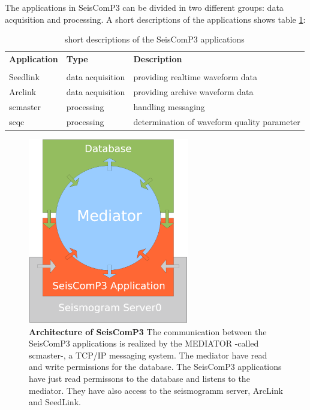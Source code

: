 \documentclass[11pt,a4paper,titlepage]{article}
\begin{document}
The applications in SeisComP3 can be divided in two different groups: data acquisition and processing. A short descriptions of the applications shows table \ref{tab_sc3applications}:

\begin{table}[h]
	\begin{tabular}{lll}
		\textbf{Application} & \textbf{Type} & \textbf{Description} \\
		\\
		Seedlink & data acquisition & providing realtime waveform data \\
		Arclink & data acquisition & providing archive waveform data \\
		scmaster & processing & handling messaging \\
		scqc & processing & determination of waveform quality parameter \\
	\end{tabular}
	\caption{short descriptions of the SeisComP3 applications}
	\label{tab_sc3applications}
\end{table}

\begin{figure}[ht]
	\centering
	\includegraphics[width=7cm]{Mediator_neries.eps}
	\caption[Architecture of SeisComP3]{\textbf{Architecture of SeisComP3}
	The communication between the SeisComP3 applications is realized by the MEDIATOR -called scmaster-,
	a TCP/IP messaging system. The mediator have read and write permissions for the database. The
	SeisComP3 applications have just read permissons to the database and listens to the mediator. They
	have also access to the seismogramm server, ArcLink and SeedLink.}
	\label{fig_sc3mediator}
\end{figure}

\newpage
\end{document}
